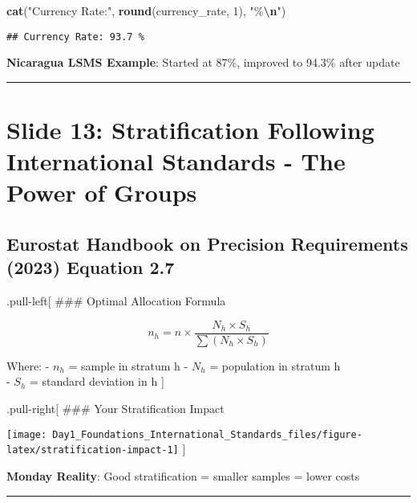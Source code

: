 \documentclass[
]{article}
\newenvironment{Shaded}{\begin{snugshade}}{\end{snugshade}}
\newcommand{\DecValTok}[1]{\textcolor[rgb]{0.00,0.00,0.81}{#1}}
\newcommand{\FunctionTok}[1]{\textcolor[rgb]{0.13,0.29,0.53}{\textbf{#1}}}
\newcommand{\NormalTok}[1]{#1}
\newcommand{\SpecialCharTok}[1]{\textcolor[rgb]{0.81,0.36,0.00}{\textbf{#1}}}
\newcommand{\StringTok}[1]{\textcolor[rgb]{0.31,0.60,0.02}{#1}}
\begin{document}
\begin{Shaded}
\begin{Highlighting}[]
\FunctionTok{cat}\NormalTok{(}\StringTok{"Currency Rate:"}\NormalTok{, }\FunctionTok{round}\NormalTok{(currency\_rate, }\DecValTok{1}\NormalTok{), }\StringTok{"\%}\SpecialCharTok{\textbackslash{}n}\StringTok{"}\NormalTok{)}
\end{Highlighting}
\end{Shaded}

\begin{verbatim}
## Currency Rate: 93.7 %
\end{verbatim}

\textbf{Nicaragua LSMS Example}: Started at 87\%, improved to 94.3\%
after update

\begin{center}\rule{0.5\linewidth}{0.5pt}\end{center}

\section{Slide 13: Stratification Following International Standards -
The Power of
Groups}\label{slide-13-stratification-following-international-standards---the-power-of-groups}

\subsection{Eurostat Handbook on Precision Requirements (2023) Equation
2.7}\label{eurostat-handbook-on-precision-requirements-2023-equation-2.7}

.pull-left{[} \#\#\# Optimal Allocation Formula

\[n_h = n \times \frac{N_h \times S_h}{\sum(N_h \times S_h)}\]

Where: - \(n_h\) = sample in stratum h - \(N_h\) = population in stratum
h\\
- \(S_h\) = standard deviation in h {]}

.pull-right{[} \#\#\# Your Stratification Impact

\texttt{[image: Day1\_Foundations\_International\_Standards\_files/figure-latex/stratification-impact-1]}
{]}

\textbf{Monday Reality}: Good stratification = smaller samples = lower
costs

\begin{center}\rule{0.5\linewidth}{0.5pt}\end{center}
\end{document}
